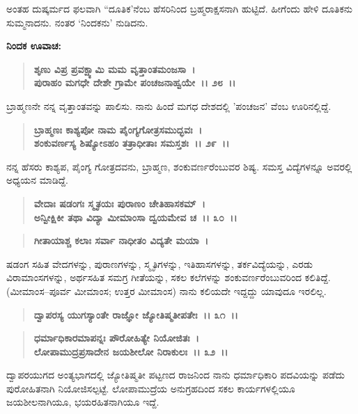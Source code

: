 ಅಂತಹ ದುಷ್ಕರ್ಮದ ಫಲವಾಗಿ “ದೂತಿಕ'ನೆಂಬ ಹೆಸರಿನಿಂದ ಬ್ರಹ್ಮರಾಕ್ಷಸನಾಗಿ ಹುಟ್ಟಿದೆ. ಹೀಗೆಂದು ಹೇಳಿ ದೂತಿಕನು ಸುಮ್ಮನಾದನು. ನಂತರ `ನಿಂದಕನು' ನುಡಿದನು.

\begin{flushleft}
\textbf{ನಿಂದಕ ಊವಾಚ:}
\end{flushleft}

\begin{verse}
\textbf{ಶೃಣು ವಿಪ್ರ ಪ್ರವಕ್ಷ್ಯಾಮಿ ಮಮ ವೃತ್ತಾಂತಮಂಜಸಾ~।}\\\textbf{ಪುರಾಹಂ ಮಗಧೇ ದೇಶೇ ಗ್ರಾಮೇ ಪಂಚಜನಾಹ್ವಯೇ~।। ೨೮~।।}
\end{verse}

ಬ್ರಾಹ್ಮಣನೇ ನನ್ನ ವೃತ್ತಾಂತವನ್ನು ಪಾಲಿಸು. ನಾನು ಹಿಂದೆ ಮಗಧ ದೇಶದಲ್ಲಿ 'ಪಂಚಜನ' ವೆಂಬ ಊರಿನಲ್ಲಿದ್ದೆ.

\begin{verse}
\textbf{ಬ್ರಾಹ್ಮಣಃ ಕಾಶ್ಯಪೋ ನಾಮ ಪೈಂಗ್ಯಗೋತ್ರಸಮುದ್ಭವಃ~।}\\\textbf{ಶಂಕುವರ್ಣಸ್ಯ ಶಿಷ್ಯೋಽಹಂ ತತ್ರಾಧೀತಾಃ ಸಮಸ್ತಶಃ~।। ೨೯~।।}
\end{verse}

ನನ್ನ ಹೆಸರು ಕಾಶ್ಯಪ, ಪೈಂಗ್ಯ ಗೋತ್ರದವನು, ಬ್ರಾಹ್ಮಣ, ಶಂಕುವರ್ಣರೆಂಬುವರ ಶಿಷ್ಯ. ಸಮಸ್ತ ವಿದ್ಯೆಗಳನ್ನೂ ಅವರಲ್ಲಿ ಅಧ್ಯಯನ ಮಾಡಿದ್ದೆ.

\begin{verse}
\textbf{ವೇದಾಃ ಷಡಂಗಃ ಸ್ಮೃತಯಃ ಪುರಾಣಂ ಚೇತಿಹಾಸಕಮ್~।}\\\textbf{ಅನ್ವೀಕ್ಷಿಕೀ ತಥಾ ವಿದ್ಯಾ ಮೀಮಾಂಸಾ ದ್ವಯಮೇವ ಚ~।। ೩೦~।।}
\end{verse}

\begin{verse}
\textbf{ಗೀತಾಯಾಶ್ಚ ಕಲಾಃ ಸರ್ವಾ ನಾಧೀತಂ ವಿದ್ಯತೇ ಮಯಾ~।}
\end{verse}

ಷಡಂಗ ಸಹಿತ ವೇದಗಳನ್ನು, ಪುರಾಣಗಳನ್ನು, ಸ್ಮೃತಿಗಳನ್ನು, ಇತಿಹಾಸಗಳನ್ನು, ತರ್ಕವಿದ್ಯೆಯನ್ನು, ಎರಡು ವಿರಾಮಾಂಸಗಳನ್ನು, ಅರ್ಥಸಹಿತ ಸಮಗ್ರ ಗೀತೆಯನ್ನು, ಸಕಲ ಕಲೆಗಳನ್ನು ಶಂಕುವರ್ಣರೆಂಬುವರಿಂದ ಕಲಿತಿದ್ದೆ. (ಮೀಮಾಂಸ–ಪೂರ್ವ ಮೀಮಾಂಸ; ಉತ್ತರ ಮೀಮಾಂಸ) ನಾನು ಕಲಿಯದೇ ಇದ್ದದ್ದು ಯಾವುದೂ ಇರಲಿಲ್ಲ.

\begin{verse}
\textbf{ದ್ವಾಪರಸ್ಯ ಯುಗಸ್ಯಾಂತೇ ರಾಜ್ಞೋ ಜ್ಯೋತಿಷ್ಮತೀಪತೇಃ~।। ೩೧~।।}
\end{verse}

\begin{verse}
\textbf{ಧರ್ಮಾಧಿಕಾರಮಾಪನ್ನಃ ಪೌರೋಹಿತ್ಯೇ ನಿಯೋಜಿತಃ~।}\\\textbf{ಲೋಪಾಮುದ್ರಪ್ರಸಾದೇನ ಜಯಶೀಲೋ ನಿರಾಕುಲಃ~।। ೩೨~।।}
\end{verse}

ದ್ವಾಪರಯುಗದ ಅಂತ್ಯಭಾಗದಲ್ಲಿ ಜ್ಯೋತಿಷ್ಮತೀ ಪಟ್ಟಣದ ರಾಜನಿಂದ ನಾನು ಧರ್ಮಾಧಿ\-ಕಾರಿ ಪದವಿಯನ್ನು ಪಡೆದು ಪುರೋಹಿತನಾಗಿ ನಿಯೋಜಿಸಲ್ಪಟ್ಟೆ. ಲೋಪಾಮುದ್ರೆಯ ಅನುಗ್ರಹದಿಂದ ಸಕಲ ಕಾರ್ಯಗಳಲ್ಲಿಯೂ ಜಯಶೀಲನಾಗಿಯೂ, ಭಯರಹಿತನಾಗಿಯೂ ಇದ್ದೆ.

